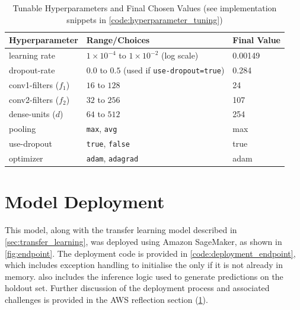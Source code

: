 \begin{table}[h]
    \centering
    \caption{Tunable Hyperparameters and Final Chosen Values (see implementation snippets in \cref{code:hyperparameter_tuning})}
    \begin{tabular}{lll}
    \toprule
    \textbf{Hyperparameter} & \textbf{Range/Choices} & \textbf{Final Value} \\
    \midrule
    learning rate           & $1{\times}10^{-4}$ to $1{\times}10^{-2}$ (log scale) & 0.00149 \\
    dropout-rate            & $0.0$ to $0.5$ (used if \texttt{use-dropout=true}) & 0.284 \\
    conv1-filters ($f_1$)   & $16$ to $128$ & 24 \\
    conv2-filters ($f_2$)   & $32$ to $256$ & 107 \\
    dense-units ($d$)       & $64$ to $512$ & 254 \\
    pooling                 & \texttt{max}, \texttt{avg} & max \\
    use-dropout             & \texttt{true}, \texttt{false} & true \\
    optimizer               & \texttt{adam}, \texttt{adagrad} & adam \\
    \bottomrule
    \end{tabular}
    \label{tab:tunable_hyperparameters}
\end{table}

\begin{figure}[h]
    
\end{figure}

\begin{figure}[p]
    
\end{figure}

\newpage

\section{Model Deployment} \label{sec:model_deployment}

This model, along with the transfer learning model described in \cref{sec:transfer_learning}, was deployed using Amazon SageMaker, as shown in \cref{fig:endpoint}. The deployment code is provided in \cref{code:deployment_endpoint}, which includes exception handling to initialise the  only if it is not already in memory.  also includes the inference logic used to generate predictions on the holdout set. Further discussion of the deployment process and associated challenges is provided in the AWS reflection section (\cref{sec:model_deployment}).

